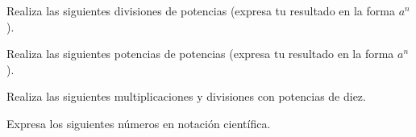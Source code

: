 \documentclass[11pt,addpoints]{exam}
\begin{document}
\begin{questions}
    Realiza las siguientes divisiones de potencias (expresa tu resultado en la forma $a^n$).
    \begin{multicols}{2}
        \begin{parts}
            
            
        \end{parts}
    \end{multicols}
    \newpage
    Realiza las siguientes potencias de potencias (expresa tu resultado en la forma $a^n$).
    \begin{multicols}{2}
        \begin{parts}
            
            
        \end{parts}
    \end{multicols}

    Realiza las siguientes multiplicaciones y divisiones con potencias de diez.
    \begin{parts}
        
        
    \end{parts}
    Expresa los siguientes n\'umeros en notaci\'on cient\'ifica.
    \begin{multicols}{2}
        \begin{parts}
            
            
        \end{parts}
    \end{multicols}
\end{questions}
\end{document}
